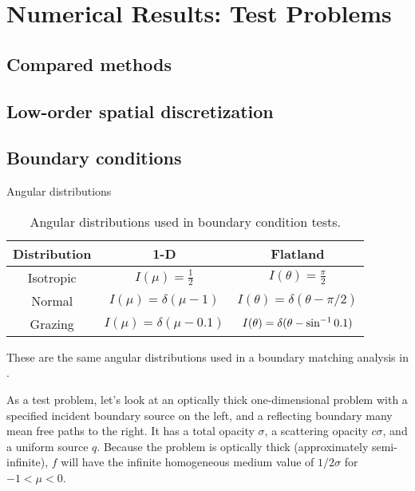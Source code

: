 
\chapter{Numerical Results: Test Problems}


\section{Compared methods}

\section{Low-order spatial discretization}

\section{Boundary conditions}

Angular distributions

\begin{table}[htb]
  \centering
  \begin{tabular}{ccc}
\toprule
    Distribution & 1-D & Flatland
\\ \midrule
Isotropic & $I(\mu) = \frac{1}{2}$ & $I(\theta) = \frac{\pi}{2}$
\\
Normal & $I(\mu) = \delta(\mu-1)$ & $I(\theta) = \delta(\theta-\pi/2)$
\\
Grazing & $I(\mu) = \delta(\mu-0.1)$ & $I(\theta) = \delta(\theta-\sin^{-1}0.1)$
\\ \bottomrule
  \end{tabular}
  \caption{Angular distributions used in boundary condition tests.}
  \label{tab:angularDistributions}
\end{table}

These are the same angular distributions used in a boundary matching analysis
in \cite{Dav2006}.

\horizsep

As a test problem, let's look at an optically thick one-dimensional problem
with a specified incident boundary source on the left, and a reflecting
boundary many mean free paths to the right. It has a total opacity $\sigma$, a
scattering opacity $c\sigma$, and a uniform source $q$. Because the problem is
optically thick (approximately semi-infinite), $f$ will have the infinite
homogeneous medium value of $1/2\sigma$ for $-1 < \mu < 0$.

